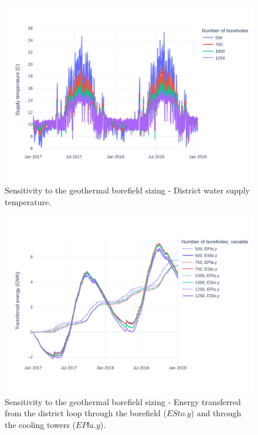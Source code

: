 \begin{figure}[!htbp]
\centering
\includegraphics[width=\linewidth]{../python_scripts/figures/GeoSizing.pdf}
\caption{Sensitivity to the geothermal borefield sizing - District water supply temperature.}
\label{fig:geo_sizing}
\end{figure}

\begin{figure}[!htbp]
\centering
\includegraphics[width=\linewidth]{../python_scripts/figures/GeoSizingE.pdf}
\caption{Sensitivity to the geothermal borefield sizing - Energy transferred from the district loop through the borefield ($ESto.y$) and through the cooling towers ($EPla.y$).}
\label{fig:geo_cooling}
\end{figure}



